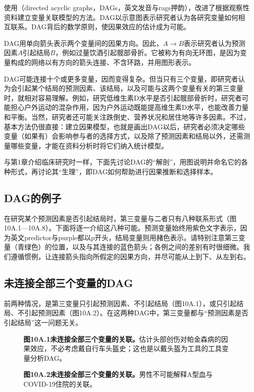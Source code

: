 使用（directed acyclic graphs，DAGs，英文发音与rags押韵），改进了根据观察性资料建立变量关联模型的方法。DAG以示意图表示研究者认为各研究变量如何相互联系。DAG背后的数学原则，使因果效应的估计成为可能。

DAG用单向箭头表示两个变量间的因果方向。因此，$A\to B$表示研究者认为预测因素$A$引起结局$B$，例如过量饮酒引起髋部骨折。它被称为有向无环图，是因为变量构成的网络以有方向的箭头连接、不含环路，并用图形表示。

DAG可能连接十个或更多变量，因而变得复杂。但当只有三个变量，即研究者认为会引起某个结局的预测因素、该结局，以及可能与这两个变量有关的第三变量时，就相对容易理解。例如，研究低维生素D水平是否引起髋部骨折时，研究者可能担心户外运动的混杂作用，因为户外运动既能提高维生素D水平，也能改善力量和平衡。当然，研究者还可能关注跌倒史、营养状况和居住地等许多因素。不过，基本方法仍很直接：建立因果模型，也就是画出DAG以后，研究者必须决定哪些变量（如果有）会影响参与者的选择方式，以及除了预测因素和结局以外，还需测量哪些变量，才能在资料分析时将它们纳入统计模型。

与第1章介绍临床研究时一样，下面先讨论DAG的“解剖”，用图说明并命名它的各种形式，再讨论其“生理”，即DAG如何帮助进行因果推断和选择样本。

\subsection{DAG的例子}
在研究某个预测因素是否引起结局时，第三变量与二者只有八种联系形式（图10A.1—10A.8）。下面将逐一介绍这八种可能。预测变量始终用紫色文字表示，因为英文predictor与purple都以p开头，结局变量则用赭色表示。请特别注意第三变量（青绿色）的位置，以及与其连接的蓝色箭头；各例之间的差别有时很细微。我们遵循惯例，让连接箭头指向所假定的因果方向，并尽可能从上到下、从左到右。

\subsection{未连接全部三个变量的DAG}
前两种情况，是第三变量只引起预测因素、不引起结局（图10A.1），或只引起结局、不引起预测因素（图10A.2）。在这两种DAG中，第三变量都与“预测因素是否引起结局”这一问题无关。
\par
\begin{figure}[htbp]\centering{}
\caption*{\textbf{图10A.1\quad 未连接全部三个变量的关联。}估计头部创伤对帕金森病的因果效应，不必考虑戴自行车头盔史；这也是以戴头盔为工具的工具变量分析DAG。}
\end{figure}
\par
\par
\begin{figure}[htbp]\centering{}
\caption*{\textbf{图10A.2\quad 未连接全部三个变量的关联。}男性不可能解释A型血与COVID-19住院的关联。}
\end{figure}
\par


